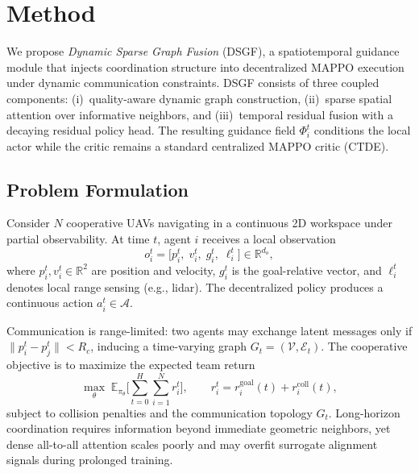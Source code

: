 
\section{Method}
\label{sec:method}

We propose \emph{Dynamic Sparse Graph Fusion} (DSGF), a spatiotemporal guidance
module that injects coordination structure into decentralized MAPPO execution
under dynamic communication constraints.
DSGF consists of three coupled components:
(i)~quality-aware dynamic graph construction,
(ii)~sparse spatial attention over informative neighbors, and
(iii)~temporal residual fusion with a decaying residual policy head.
The resulting guidance field $\Phi_i^{t}$ conditions the local actor while the
critic remains a standard centralized MAPPO critic (CTDE).

\subsection{Problem Formulation}
\label{sec:problem}

Consider $N$ cooperative UAVs navigating in a continuous 2D workspace under
partial observability.
At time $t$, agent $i$ receives a local observation
\begin{equation}
o_i^{t}
=
\bigl[
p_i^{t},\;
v_i^{t},\;
g_i^{t},\;
\ell_i^{t}
\bigr]
\in \mathbb{R}^{d_o},
\end{equation}
where $p_i^{t},v_i^{t}\in\mathbb{R}^{2}$ are position and velocity,
$g_i^{t}$ is the goal-relative vector, and $\ell_i^{t}$ denotes local range
sensing (e.g., lidar).
The decentralized policy produces a continuous action $a_i^{t}\in\mathcal{A}$.

Communication is range-limited: two agents may exchange latent messages only if
$\|p_i^{t}-p_j^{t}\|<R_c$, inducing a time-varying graph
$G_t=(\mathcal{V},\mathcal{E}_t)$.
The cooperative objective is to maximize the expected team return
\begin{equation}
\max_{\theta}
\;
\mathbb{E}_{\pi_\theta}
\Biggl[
\sum_{t=0}^{H}
\sum_{i=1}^{N}
r_i^{t}
\Biggr],
\qquad
r_i^{t}
=
r_i^{\mathrm{goal}}(t)
+
r_i^{\mathrm{coll}}(t),
\end{equation}
subject to collision penalties and the communication topology $G_t$.
Long-horizon coordination requires information beyond immediate geometric
neighbors, yet dense all-to-all attention scales poorly and may overfit
surrogate alignment signals during prolonged training.

